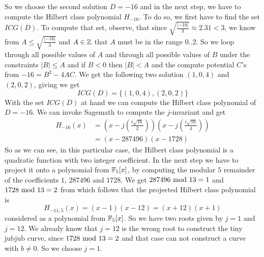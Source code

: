 \begin{example}
So we choose the second solution $D=-16$ and in the next step, we have to compute the Hilbert class polynomial $H_{-16}$. To do so, we first have to find the set $ICG(D)$. To compute that set, observe, that since $\sqrt{\frac{|-16|}{3}}\approx 2.31<3$, we know from $A\leq \sqrt{\frac{|-16|}{3}}$ and $A\in\mathbb{Z}$ that $A$ must be in the range $0..2$. So we loop through all possible values of $A$ and through all possible values of $B$ under the constraints $|B|\leq A$ and if $B<0$ then $|B|<A$
and the compute potential $C$'s from $-16 = B^2 -4AC$. We get the following two solution $(1,0,4)$ and $(2,0,2)$, giving  
we get
$$
ICG(D)=\{(1,0,4),(2,0,2)\}
$$
With the set $ICG(D)$ at hand we can compute the Hilbert class polynomial of $D=-16$. We can invoke Sagemath to compute the $j$-invariant and get 
\begin{align*}
H_{-16}(x) &= \left(x - j\left(\frac{i\sqrt{16}}{2}\right)\right)
 \left(x - j\left(\frac{i\sqrt{16}}{4}\right)\right) \\
           &= (x- 287496)(x-1728)
\end{align*}
So as we can see, in this particular case, the Hilbert class polynomial is a quadratic function with two integer coefficient. In the next step we have to project it onto a polynomial from $\mathbb{F}_5[x]$, by computing the modular $5$ remainder of the coefficients $1$, $287496$ and $1728$. We get $287496 \text{ mod } 13=1$ and $1728 \text{ mod } 13=2$ from which follows that the projected Hilbert class polynomial is  
$$
H_{-11,5}(x)=(x-1)(x-12)= (x+12)(x+1)
$$ 
considered as a polynomial from $\mathbb{F}_5[x]$. So we have two roots given by $j=1$ and $j=12$. We already know that $j=12$ is the wrong root to construct the tiny jubjub curve, since $1728 \text{ mod } 13=2$ and that case can not construct a curve with $b\neq 0$. So we choose $j=1$.


\end{example}
